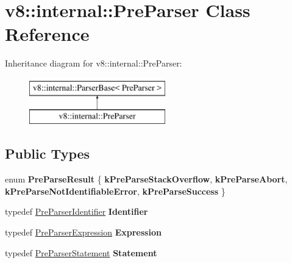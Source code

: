 \hypertarget{classv8_1_1internal_1_1PreParser}{}\section{v8\+:\+:internal\+:\+:Pre\+Parser Class Reference}
\label{classv8_1_1internal_1_1PreParser}
Inheritance diagram for v8\+:\+:internal\+:\+:Pre\+Parser\+:\begin{figure}[H]
\begin{center}
\leavevmode
\includegraphics[height=2.000000cm]{classv8_1_1internal_1_1PreParser}
\end{center}
\end{figure}
\subsection*{Public Types}
\begin{DoxyCompactItemize}
\item 
\mbox{\label{classv8_1_1internal_1_1PreParser_ac699e8c83f71d51ea5ad08af12acf9f9}} 
enum {\bfseries Pre\+Parse\+Result} \{ {\bfseries k\+Pre\+Parse\+Stack\+Overflow}, 
{\bfseries k\+Pre\+Parse\+Abort}, 
{\bfseries k\+Pre\+Parse\+Not\+Identifiable\+Error}, 
{\bfseries k\+Pre\+Parse\+Success}
 \}
\item 
\mbox{\label{classv8_1_1internal_1_1PreParser_a88411e7cd2cbc7a480a32471f2db01e8}} 
typedef \mbox{\hyperlink{classv8_1_1internal_1_1PreParserIdentifier}{Pre\+Parser\+Identifier}} {\bfseries Identifier}
\item 
\mbox{\label{classv8_1_1internal_1_1PreParser_ae3385c22c7148a44bad3c3b3d6265867}} 
typedef \mbox{\hyperlink{classv8_1_1internal_1_1PreParserExpression}{Pre\+Parser\+Expression}} {\bfseries Expression}
\item 
\mbox{\label{classv8_1_1internal_1_1PreParser_a63f5606243398ad8e868162f6103eb96}} 
typedef \mbox{\hyperlink{classv8_1_1internal_1_1PreParserStatement}{Pre\+Parser\+Statement}} {\bfseries Statement}
\end{DoxyCompactItemize}
